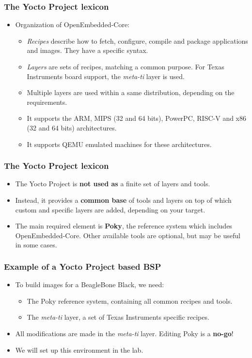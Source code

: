 \begin{frame}
  \frametitle{The Yocto Project lexicon}
  \begin{itemize}
    \item Organization of OpenEmbedded-Core:
    \begin{itemize}
      \item {\em Recipes} describe how to fetch, configure, compile
        and package applications and images. They have a specific
        syntax.
      \item {\em Layers} are sets of recipes, matching a common
        purpose. For Texas Instruments board support, the {\em
        meta-ti} layer is used.
      \item Multiple layers are used within a same distribution,
        depending on the requirements.
      \item It supports the ARM, MIPS (32 and 64 bits), PowerPC,
        RISC-V and x86 (32 and 64 bits) architectures.
      \item It supports QEMU emulated machines for these architectures.
    \end{itemize}
  \end{itemize}
\end{frame}

\begin{frame}
  \frametitle{The Yocto Project lexicon}
  \begin{itemize}
    \item The Yocto Project is \textbf{not used as} a finite set of
          layers and tools.
    \item Instead, it provides a \textbf{common base} of tools and
          layers on top of which custom and specific layers are added,
          depending on your target.
    \item The main required element is \textbf{Poky}, the reference
          system which includes OpenEmbedded-Core. Other available
          tools are optional, but may be useful in some cases.
  \end{itemize}
\end{frame}

\begin{frame}
  \frametitle{Example of a Yocto Project based BSP}
  \begin{itemize}
    \item To build images for a BeagleBone Black, we need:
    \begin{itemize}
      \item The Poky reference system, containing all common recipes
            and tools.
      \item The {\em meta-ti} layer, a set of Texas Instruments
            specific recipes.
    \end{itemize}
    \item All modifications are made in the {\em meta-ti} layer.
      Editing Poky is a \textbf{no-go}!
    \item We will set up this environment in the lab.
  \end{itemize}
\end{frame}

